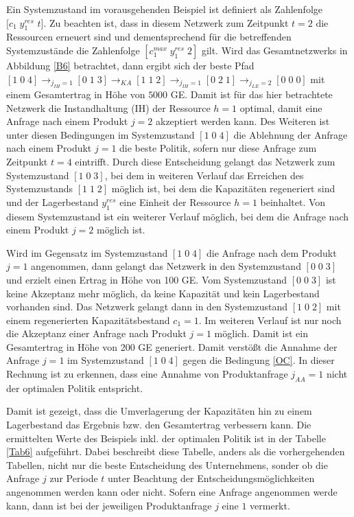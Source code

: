 Ein Systemzustand im vorausgehenden Beispiel ist definiert als Zahlenfolge $[c_1\;y^{res}_1$ $t]$. Zu beachten ist, dass in diesem Netzwerk zum Zeitpunkt $t=2$ die Ressourcen erneuert sind und dementsprechend für die betreffenden Systemzustände die Zahlenfolge $[c_1^{max}\;y^{res}_1\;2]$ gilt. Wird das Gesamtnetzwerks in Abbildung \ref{B6} betrachtet, dann ergibt sich der beste Pfad $[1\;0\;4] \rightarrow_{j_{IH}=1} [0\;1\;3] \rightarrow_{KA} [1\;1\;2] \rightarrow_{j_{IH}=1} [0\;2\;1] \rightarrow_{j_{LE}=2} [0\;0\;0]$ mit einem Gesamtertrag in Höhe von $5000$ GE. Damit ist für das hier betrachtete Netzwerk die Instandhaltung (IH) der Ressource $h=1$ optimal, damit eine Anfrage nach einem Produkt $j=2$ akzeptiert werden kann. Des Weiteren ist unter diesen Bedingungen im Systemzustand $[1\;0\;4]$ die Ablehnung der Anfrage nach einem Produkt $j=1$ die beste Politik, sofern nur diese Anfrage zum Zeitpunkt $t=4$ eintrifft. Durch diese Entscheidung gelangt das Netzwerk zum Systemzustand $[1\;0\;3]$, bei dem in weiteren Verlauf das Erreichen des Systemzustands $[1\;1\;2]$ möglich ist, bei dem die Kapazitäten regeneriert sind und der Lagerbestand $y_1^{res}$ eine Einheit der Ressource $h=1$ beinhaltet. Von diesem Systemzustand ist ein weiterer Verlauf möglich, bei dem die Anfrage nach einem Produkt $j=2$ möglich ist.

Wird im Gegensatz im Systemzustand $[1\;0\;4]$ die Anfrage nach dem Produkt $j=1$ angenommen, dann gelangt das Netzwerk in den Systemzustand $[0\;0\;3]$ und erzielt einen Ertrag in Höhe von 100 GE. Vom Systemzustand $[0\;0\;3]$ ist keine Akzeptanz mehr möglich, da keine Kapazität und kein Lagerbestand vorhanden sind. Das Netzwerk gelangt dann in den Systemzustand $[1\;0\;2]$ mit einem regenerierten Kapazitätsbestand $c_1=1$. Im weiteren Verlauf ist nur noch die Akzeptanz einer Anfrage nach Produkt $j=1$ möglich. Damit ist ein Gesamtertrag in Höhe von 200 GE generiert. Damit verstößt die Annahme der Anfrage $j=1$ im Systemzustand $[1\;0\;4]$ gegen die Bedingung \eqref{OC}. In dieser Rechnung ist zu erkennen, dass eine Annahme von Produktanfrage $j_{AA}=1$ nicht der optimalen Politik entspricht.

Damit ist gezeigt, dass die Umverlagerung der Kapazitäten hin zu einem Lagerbestand das Ergebnis bzw. den Gesamtertrag verbessern kann. Die ermittelten Werte des Beispiels inkl. der optimalen Politik ist in der Tabelle \ref{Tab6} aufgeführt. Dabei beschreibt diese Tabelle, anders als die vorhergehenden Tabellen, nicht nur die beste Entscheidung des Unternehmens, sonder ob die Anfrage $j$ zur Periode $t$ unter Beachtung der Entscheidungsmöglichkeiten angenommen werden kann oder nicht. Sofern eine Anfrage angenommen werde kann, dann ist bei der jeweiligen Produktanfrage $j$ eine $1$ vermerkt.

